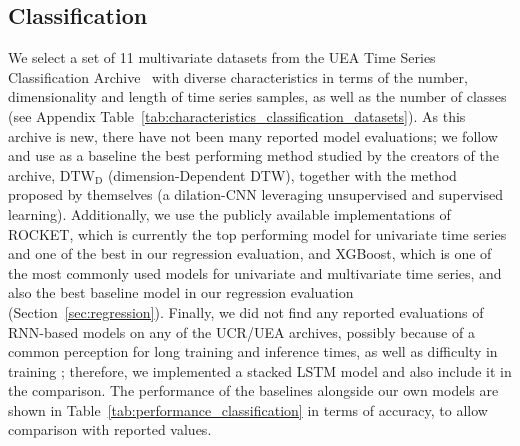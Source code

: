 \documentclass{article} \usepackage{iclr2021_conference,times}
\begin{document}
\subsection{Classification}

We select a set of 11 multivariate datasets from the UEA Time Series Classification Archive~\citep{bagnall_uea_2018} with diverse characteristics in terms of the number, dimensionality and length of time series samples, as well as the number of classes (see Appendix Table~\ref{tab:characteristics_classification_datasets}). As this archive is new, there have not been many reported model evaluations; we follow \cite{franceschi19} and use as a baseline the best performing method studied by the creators of the archive, $\text{DTW}_\text{D}$ (dimension-Dependent DTW), together with the method proposed by \cite{franceschi19} themselves (a dilation-CNN leveraging unsupervised and supervised learning).
Additionally, we use the publicly available implementations \cite{Tan2020Time} of ROCKET, which is currently the top performing model for univariate time series and one of the best in our regression evaluation, and XGBoost, which is one of the most commonly used models for univariate and multivariate time series, and also the best baseline model in our regression evaluation (Section~\ref{sec:regression}). 
Finally, we did not find any reported evaluations of RNN-based models on any of the UCR/UEA archives, possibly because of a common perception for long training and inference times, as well as difficulty in training \citep{ismail_fawaz_deep_review2019}; therefore, we implemented a stacked LSTM model and also include it in the comparison. The performance of the baselines alongside our own models are shown in Table~\ref{tab:performance_classification} in terms of accuracy, to allow comparison with reported values.
\end{document}
